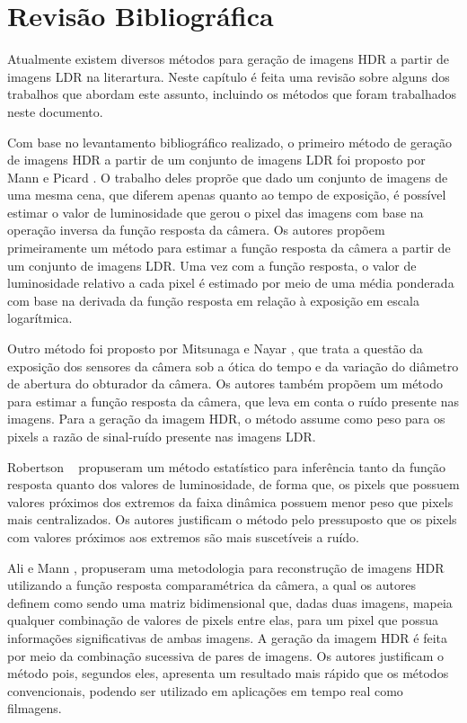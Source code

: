 \section{Revisão Bibliográfica} \label{revisao}
Atualmente existem diversos métodos para geração de imagens HDR a partir de imagens LDR na literartura. Neste capítulo é feita uma revisão sobre alguns dos trabalhos que abordam este assunto, incluindo os métodos que foram trabalhados neste documento.


Com base no levantamento bibliográfico realizado, o primeiro método de geração de imagens HDR a partir de um conjunto de imagens LDR foi proposto por Mann e Picard \cite{mann}. O trabalho deles proprõe que dado um conjunto de imagens de uma mesma cena, que diferem apenas quanto ao tempo de exposição, é possível estimar o valor de luminosidade que gerou o pixel das imagens com base na operação inversa da função resposta da câmera. Os autores propõem primeiramente um método para estimar a função resposta da câmera a partir de um conjunto de imagens LDR. Uma vez com a função resposta, o valor de luminosidade relativo a cada pixel é estimado por meio de uma média ponderada com base na derivada da função resposta em relação à exposição em escala logarítmica.


Outro método foi proposto por Mitsunaga e Nayar \cite{mitsunaga}, que trata a questão da exposição dos sensores da câmera sob a ótica do tempo e da variação do diâmetro de abertura do obturador da câmera. Os autores também propõem um método para estimar a função resposta da câmera, que leva em conta o ruído presente nas imagens. Para a geração da imagem HDR, o método assume como peso para os pixels a razão de sinal-ruído presente nas imagens LDR.


Robertson \etal~\cite{robertson} propuseram um método estatístico para inferência tanto da função resposta quanto dos valores de luminosidade, de forma que, os pixels que possuem valores próximos dos extremos da faixa dinâmica possuem menor peso que pixels mais centralizados. Os autores justificam o método pelo pressuposto que os pixels com valores próximos aos extremos são mais suscetíveis a ruído.


Ali e Mann \cite{ali}, propuseram uma metodologia para reconstrução de imagens HDR utilizando a função resposta comparamétrica da câmera, a qual os autores definem como sendo uma matriz bidimensional que, dadas duas imagens, mapeia qualquer combinação de valores de pixels entre elas, para um pixel que possua informações significativas de ambas imagens. A geração da imagem HDR é feita por meio da combinação sucessiva de pares de imagens. Os autores justificam o método pois, segundos eles, apresenta um resultado mais rápido que os métodos convencionais, podendo ser utilizado em aplicações em tempo real como filmagens.



